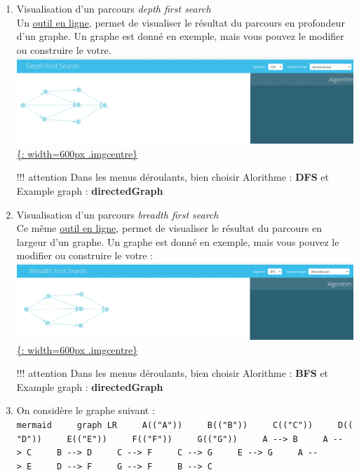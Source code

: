 \documentclass[
  letterpaper,
  DIV=11,
  numbers=noendperiod]{scrartcl}
\begin{document}
\begin{enumerate}
\def\labelenumi{\arabic{enumi}.}
\item
  Visualisation d'un parcours \emph{depth first search}\\
  Un
  \href{https://workshape.github.io/visual-graph-algorithms/\#dfs-visualisation}{outil
  en ligne}, permet de visualiser le résultat du parcours en profondeur
  d'un graphe. Un graphe est donné en exemple, mais vous pouvez le
  modifier ou construire le votre.
  \href{https://workshape.github.io/visual-graph-algorithms/\#dfs-visualisation}{\includegraphics{data/dfs.png}\{:
  width=600px .imgcentre\}}

  !!! attention Dans les menus déroulants, bien choisir Alorithme :
  \textbf{DFS} et Example graph : \textbf{directedGraph}
\item
  Visualisation d'un parcours \emph{breadth first search}\\
  Ce même
  \href{https://workshape.github.io/visual-graph-algorithms/\#bfs-visualisation}{outil
  en ligne}, permet de visualiser le résultat du parcours en largeur
  d'un graphe. Un graphe est donné en exemple, mais vous pouvez le
  modifier ou construire le votre :
  \href{https://workshape.github.io/visual-graph-algorithms/\#bfs-visualisation}{\includegraphics{data/bfs.png}\{:
  width=600px .imgcentre\}}

  !!! attention Dans les menus déroulants, bien choisir Alorithme :
  \textbf{BFS} et Example graph : \textbf{directedGraph}
\item
  On considère le graphe suivant :\\

  \texttt{mermaid\ \ \ \ \ graph\ LR\ \ \ \ \ A(("A"))\ \ \ \ \ B(("B"))\ \ \ \ \ C(("C"))\ \ \ \ \ D(("D"))\ \ \ \ \ E(("E"))\ \ \ \ \ F(("F"))\ \ \ \ \ G(("G"))\ \ \ \ \ A\ -\/-\textgreater{}\ B\ \ \ \ \ A\ -\/-\textgreater{}\ C\ \ \ \ \ B\ -\/-\textgreater{}\ D\ \ \ \ \ C\ -\/-\textgreater{}\ F\ \ \ \ \ C\ -\/-\textgreater{}\ G\ \ \ \ \ E\ -\/-\textgreater{}\ G\ \ \ \ \ A\ -\/-\textgreater{}\ E\ \ \ \ \ D\ -\/-\textgreater{}\ F\ \ \ \ \ G\ -\/-\textgreater{}\ F\ \ \ \ \ B\ -\/-\textgreater{}\ C}


\end{enumerate}
\end{document}
